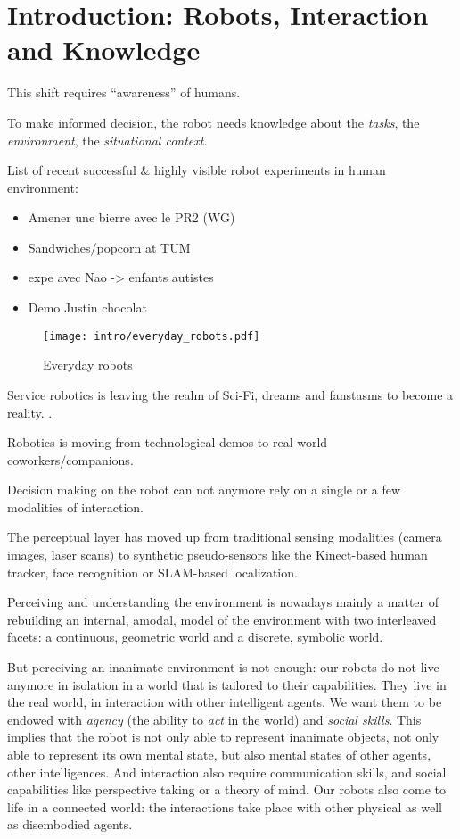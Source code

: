 \chapter{Introduction: Robots, Interaction and Knowledge}
\label{chapt|introduction}


This shift requires ``awareness'' of humans.

To make informed decision, the robot needs knowledge about the \emph{tasks},
the \emph{environment}, the \emph{situational context}.

List of recent successful \& highly visible robot experiments in human environment:
\begin{itemize}
    \item Amener une bierre avec le PR2 (WG)
    \item Sandwiches/popcorn at TUM
    \item expe avec Nao -> enfants autistes
    \item Demo Justin chocolat
\end{itemize}

\begin{figure}
    \centering
    \texttt{[image: intro/everyday\_robots.pdf]}
    \caption{Everyday robots}
    \label{fig|everyday-robots}
\end{figure}


Service robotics is leaving the realm of Sci-Fi, dreams and fanstasms to become
a reality. . 

Robotics is moving from technological demos to real world coworkers/companions.


Decision making on the robot can not anymore rely on a single or a few
modalities of interaction.

The perceptual layer has moved up from traditional sensing modalities (camera
images, laser scans) to synthetic pseudo-sensors like the Kinect-based human
tracker, face recognition or SLAM-based localization.

Perceiving and understanding the environment is nowadays mainly a matter of
rebuilding an internal, amodal, model of the environment with two interleaved
facets: a continuous, geometric world and a discrete, symbolic world.

But perceiving an inanimate environment is not enough: our robots do not live
anymore in isolation in a world that is tailored to their capabilities. They
live in the real world, in interaction with other intelligent agents. We want
them to be endowed with \emph{agency} (the ability to \emph{act} in the world)
and \emph{social skills}. This implies that the robot is not only able to
represent inanimate objects, not only able to represent its own mental state,
but also mental states of other agents, other intelligences. And interaction
also require communication skills, and social capabilities like perspective
taking or a theory of mind. Our robots also come to life in a connected world:
the interactions take place with other physical as well as disembodied agents.

